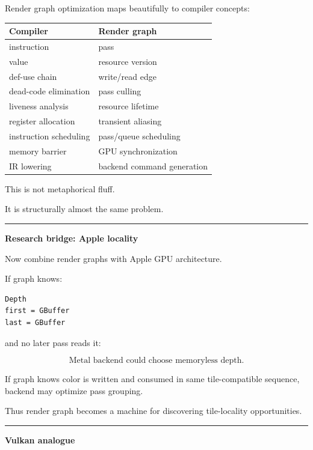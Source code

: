 Render graph optimization maps beautifully to compiler concepts:

{\def\LTcaptype{none} %
\begin{longtable}[]{@{}ll@{}}
\toprule\noalign{}
Compiler & Render graph \\
\midrule\noalign{}
\endhead
\bottomrule\noalign{}
\endlastfoot
instruction & pass \\
value & resource version \\
def-use chain & write/read edge \\
dead-code elimination & pass culling \\
liveness analysis & resource lifetime \\
register allocation & transient aliasing \\
instruction scheduling & pass/queue scheduling \\
memory barrier & GPU synchronization \\
IR lowering & backend command generation \\
\end{longtable}
}

This is not metaphorical fluff.

It is structurally almost the same problem.

\begin{center}\rule{0.5\linewidth}{0.5pt}\end{center}

\textbf{Research bridge: Apple locality}

Now combine render graphs with Apple GPU architecture.

If graph knows:

\begin{verbatim}
Depth
first = GBuffer
last = GBuffer
\end{verbatim}

and no later pass reads it:

\[
\boxed{
\text{Metal backend could choose memoryless depth}.
}
\]

If graph knows color is written and consumed in same tile-compatible sequence, backend may optimize pass grouping.

Thus render graph becomes a machine for discovering tile-locality opportunities.

\begin{center}\rule{0.5\linewidth}{0.5pt}\end{center}

\textbf{Vulkan analogue}

